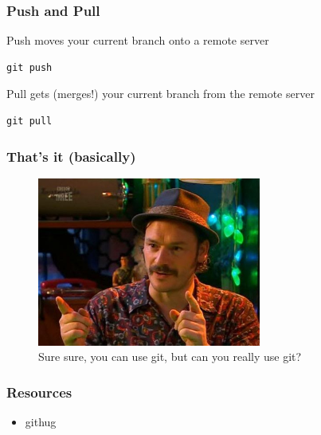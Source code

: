 \documentclass{beamer}
\begin{document}
\begin{frame}[fragile]
\frametitle{Push and Pull}

Push moves your current branch onto a remote server

\vspace{1em}

\begin{lstlisting}[frame=single]
  git push 
\end{lstlisting}

\vspace{1em}

Pull gets (merges!) your current branch from the remote server

\vspace{1em}

\begin{lstlisting}[frame=single]
  git pull 
\end{lstlisting}

\end{frame}

\begin{frame}

\frametitle{That's it (basically)}

\begin{figure}[p]
  \centering
  \includegraphics[height=15em]{howard.jpg}
  \caption{Sure sure, you can use git, but can you really use git?}
\end{figure}

\end{frame}



\begin{frame}
\frametitle{Resources}

\begin{itemize}
\item{githug}
\end{itemize}
  
\end{frame}
\end{document}
